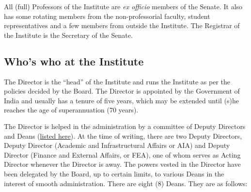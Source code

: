 \documentclass[
  10pt,
  a5paper,
  10pt,
  openany]{amsbook}
\begin{document}
All (full) Professors of the Institute are \emph{ex officio} members of
the Senate. It also has some rotating members from the non-professorial
faculty, student representatives and a few members from outside the
Institute. The Registrar of the Institute is the Secretary of the
Senate.

\subsection{Who's who at the Institute}\label{whos-who-at-the-institute}

The Director is the ``head'' of the Institute and runs the Institute as
per the policies decided by the Board. The Director is appointed by the
Government of India and usually has a tenure of five years, which may be
extended until (s)he reaches the age of superannuation (70 years).

The Director is helped in the administration by a committee of Deputy
Directors and Deans
(\href{https://www.iitb.ac.in/institute-functionaries}{listed here}). At
the time of writing, there are two Deputy Directors, Deputy Director
(Academic and Infrastructural Affairs or AIA) and Deputy Director
(Finance and External Affairs, or FEA), one of whom serves as Acting
Director whenever the Director is away. The powers vested in the
Director have been delegated by the Board, up to certain limits, to
various Deans in the interest of smooth administration. There are eight
(8) Deans. They are as follows:
\end{document}
